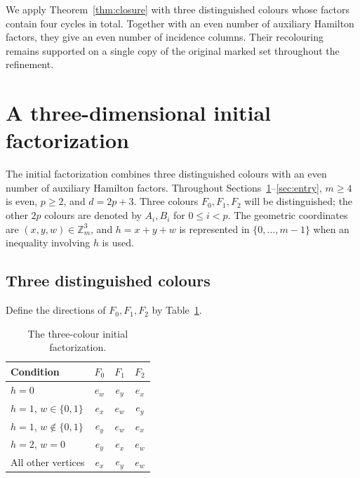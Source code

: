 \documentclass[11pt,reqno]{amsart}
\numberwithin{equation}{section}
\theoremstyle{definition}
\theoremstyle{remark}
\newcommand{\Zm}{\mathbb Z_m}
\begin{document}
We apply Theorem~\ref{thm:closure} with three distinguished colours
whose factors contain four cycles in total. Together with an even
number of auxiliary Hamilton factors, they give an even number of
incidence columns. Their recolouring remains supported on a single
copy of the original marked set throughout the refinement.

\section{A three-dimensional initial factorization}\label{sec:seed}
The initial factorization combines three distinguished colours with an
even number of auxiliary Hamilton factors. Throughout
Sections~\ref{sec:seed}--\ref{sec:entry},
$m\ge4$ is even, $p\ge2$, and $d=2p+3$. Three colours $F_0,F_1,F_2$ will be distinguished;
the other $2p$ colours are denoted by $A_i,B_i$ for $0\le i<p$. The geometric
coordinates are $(x,y,w)\in\Zm^3$, and $h=x+y+w$ is represented in
$\{0,\ldots,m-1\}$ when an inequality involving $h$ is used.

\subsection{Three distinguished colours}
Define the directions of $F_0,F_1,F_2$ by Table~\ref{tab:nearcore}.
\begin{table}[htbp]
\centering
\caption{The three-colour initial factorization.}\label{tab:nearcore}
\begin{tabular}{lccc}
\toprule
Condition & $F_0$ & $F_1$ & $F_2$\\
\midrule
$h=0$ & $e_w$ & $e_y$ & $e_x$\\
$h=1$, $w\in\{0,1\}$ & $e_x$ & $e_w$ & $e_y$\\
$h=1$, $w\notin\{0,1\}$ & $e_y$ & $e_w$ & $e_x$\\
$h=2$, $w=0$ & $e_y$ & $e_x$ & $e_w$\\
All other vertices & $e_x$ & $e_y$ & $e_w$\\
\bottomrule
\end{tabular}
\end{table}
\end{document}
